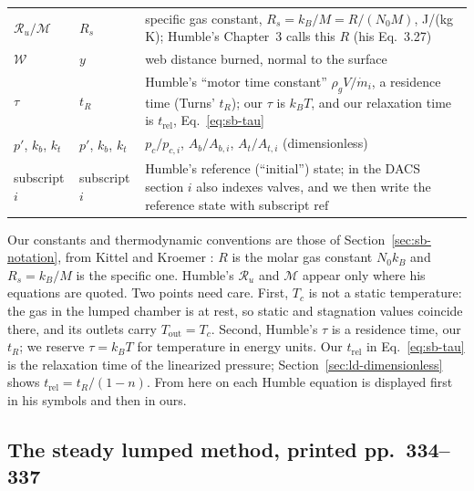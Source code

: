 \begin{center}
\begin{tabular}{p{2.2cm}p{2.0cm}p{7.6cm}}
$\mathcal R_u/\mathcal M$ & $R_s$ & specific gas constant,
                 $R_s=k_B/M=R/(N_0M)$, J/(kg\,K); Humble's Chapter~3
                 calls this $R$ (his Eq.~3.27)\\
$\mathcal W$ & $y$ & web distance burned, normal to the surface\\
$\tau$ & $t_R$ & Humble's ``motor time constant''
                 $\rho_gV/\dot m_i$, a residence time (Turns' $t_R$);
                 our $\tau$ is $k_BT$, and our relaxation time is
                 $t_{\mathrm{rel}}$, Eq.~\eqref{eq:sb-tau}\\
$p'$, $k_b$, $k_t$ & $p'$, $k_b$, $k_t$ & $p_c/p_{c,i}$,
                 $A_b/A_{b,i}$, $A_t/A_{t,i}$ (dimensionless)\\
subscript $i$ & subscript $i$ & Humble's reference (``initial'')
                 state; in the DACS section $i$ also indexes valves,
                 and we then write the reference state with
                 subscript $\mathrm{ref}$
\end{tabular}
\end{center}
Our constants and thermodynamic conventions are those of
Section~\ref{sec:sb-notation}, from Kittel and Kroemer
\cite{CKittelHKroemer1980}: $R$ is the molar gas constant $N_0k_B$ and
$R_s=k_B/M$ is the specific one. Humble's $\mathcal R_u$ and
$\mathcal M$ appear only where his equations are quoted.
Two points need care. First, $T_c$ is not a static temperature: the
gas in the lumped chamber is at rest, so static and stagnation values
coincide there, and its outlets carry $T_{\mathrm{out}}=T_c$.
Second, Humble's $\tau$ is a
residence time, our $t_R$; we reserve $\tau=k_BT$ for temperature in
energy units. Our $t_{\mathrm{rel}}$ in Eq.~\eqref{eq:sb-tau} is the relaxation
time of the linearized pressure; Section~\ref{sec:ld-dimensionless}
shows $t_{\mathrm{rel}}=t_R/(1-n)$. From here on each Humble equation is
displayed first in his symbols and then in ours.

\subsection{The steady lumped method, printed pp.~334--337}
\label{sec:ld-steady}
